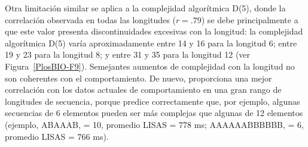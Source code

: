 Otra limitación similar se aplica a la complejidad algorítmica D(5), donde la correlación observada en todas las longitudes ($r = .79$) se debe principalmente a que este valor presenta discontinuidades excesivas con la longitud: la complejidad algorítmica D(5) varía aproximadamente entre 14 y 16 para la longitud 6; entre 19 y 23 para la longitud 8; y entre 31 y 35 para la longitud 12 (ver Figura~\ref{PlosBIO-F9}). Semejantes aumentos de complejidad con la longitud no son coherentes con el comportamiento. De nuevo, \mdlbin proporciona una mejor correlación con los datos actuales de comportamiento en una gran rango de longitudes de secuencia, porque predice correctamente que, por ejemplo, algunas secuencias de 6 elementos pueden ser más complejas que algunas de 12 elementos (ejemplo, ABAAAB, \mdlbin = 10, promedio LISAS = 778 ms; AAAAAABBBBBB, \mdlbin = 6, promedio LISAS = 766 ms).

